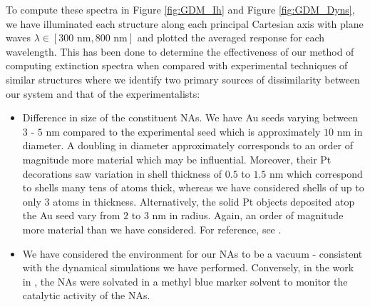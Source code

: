 To compute these spectra in Figure \ref{fig:GDM_Ih} and Figure  \ref{fig:GDM_Dyns}, we have illuminated each structure along each principal Cartesian axis with plane waves $\lambda \in [300 \text{ nm}, 800\text{ nm}]$ and plotted the averaged response for each wavelength. This has been done to determine the effectiveness of our method of computing extinction spectra when compared with experimental techniques of similar structures \cite{JorgeStructure} where we identify two primary sources of dissimilarity between our system and that of the experimentalists:

\begin{itemize}
    \item Difference in size of the constituent NAs. We have Au seeds varying between $3$ - $5$ nm compared to the experimental seed which is approximately $10$ nm in diameter. A doubling in diameter approximately corresponds to an order of magnitude more material which may be influential. Moreover, their Pt decorations saw variation in shell thickness of $0.5$ to $1.5$ nm which correspond to shells many tens of atoms thick, whereas we have considered shells of up to only $3$ atoms in thickness. Alternatively, the solid Pt objects deposited atop the Au seed vary from $2$ to $3$ nm in radius. Again, an order of magnitude more material than we have considered. For reference, see \cite{JorgeStructure}.

    \item We have considered the environment for our NAs to be a vacuum - consistent with the dynamical simulations we have performed. Conversely, in the work in \cite{JorgeStructure}, the NAs were solvated in a methyl blue marker solvent to monitor the catalytic activity of the NAs.
\end{itemize}

